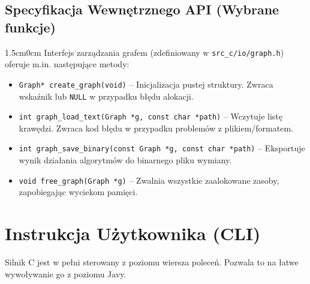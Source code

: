 \documentclass[12pt,a4paper]{article}
\begin{document}
\noindent
\begin{minipage}{\textwidth}
\subsection{Specyfikacja Wewnętrznego API (Wybrane funkcje)}
\begin{adjustwidth}{1.5cm}{0cm}
Interfejs zarządzania grafem (zdefiniowany w \texttt{src\_c/io/graph.h}) oferuje m.in. następujące metody:
\begin{itemize}
    \item \texttt{Graph* create\_graph(void)} – Inicjalizacja pustej struktury. Zwraca wskaźnik lub \texttt{NULL} w przypadku błędu alokacji.
    \item \texttt{int graph\_load\_text(Graph *g, const char *path)} – Wczytuje listę krawędzi. Zwraca kod błędu w przypadku problemów z plikiem/formatem.
    \item \texttt{int graph\_save\_binary(const Graph *g, const char *path)} – Eksportuje wynik działania algorytmów do binarnego pliku wymiany.
    \item \texttt{void free\_graph(Graph *g)} – Zwalnia wszystkie zaalokowane zasoby, zapobiegając wyciekom pamięci.
\end{itemize}
\end{adjustwidth}
\end{minipage}
\vspace{0.5cm}

\section{Instrukcja Użytkownika (CLI)}

Silnik C jest w pełni sterowany z poziomu wiersza poleceń. Pozwala to na łatwe wywoływanie go z poziomu Javy.
\end{document}

